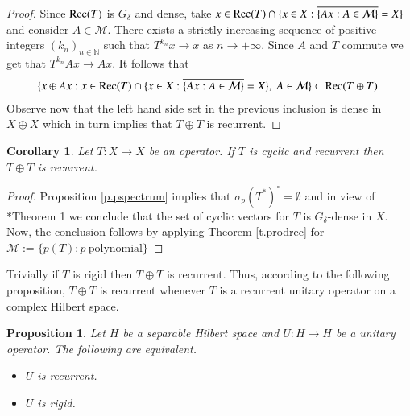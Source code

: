 \documentclass[12pt,leqno]{amsart}
\theoremstyle{plain}
\newtheorem{proposition}[equation]{Proposition}
\newtheorem{corollary}[equation]{Corollary}
\theoremstyle{definition}
\numberwithin{equation}{section}
\begin{document}
\begin{proof}
	Since ${\textnormal{Rec}}(T)$ is $G_{\delta }$ and dense, take $x\in {\textnormal{Rec}} (T)\cap \{ x\in X: \overline{ \{Ax: A\in \mathcal M \} }=X \}$ and consider $A\in \mathcal M$. There exists a strictly increasing sequence of positive integers $(k_n)_{n\in\mathbb N}$ such that $T^{k_n}x\to x$ as $n\to+\infty$. Since $A$ and $T$ commute we get that $T^{k_n}Ax\to Ax$. It follows that 
	\begin{align*}
		\{ x\oplus Ax: x\in {\textnormal{Rec}}(T)\cap \{ x\in X: \overline{ \{Ax: A\in \mathcal M \} }=X \},\ A\in \mathcal M \} \subset {\textnormal{Rec}}(T\oplus T). 
	\end{align*}
	Observe now that the left hand side set in the previous inclusion is dense in $X\oplus X$ which in turn implies that $T\oplus T$ is recurrent. 
\end{proof}

\begin{corollary}
	Let $T:X\to X$ be an operator. If $T$ is cyclic and recurrent then $T\oplus T$ is recurrent. 
\end{corollary}

\begin{proof}
	Proposition \ref{p.pspectrum} implies that $ \sigma_p(T^*) ^{\circ}=\emptyset$ and in view of \cite{H}*{Theorem 1} we conclude that the set of cyclic vectors for $T$ is $G_{\delta }$-dense in $X$. Now, the conclusion follows by applying Theorem \ref{t.prodrec} for $\mathcal M :=\{ p(T):  p \  \text{polynomial} \}$ 
\end{proof}

Trivially if $T$ is rigid then $T\oplus T$ is recurrent. Thus, according to the following proposition, $T\oplus T$ is recurrent whenever $T$ is a recurrent unitary operator on a complex Hilbert space. 

\begin{proposition}
	\label{p.urecequalsrig} Let $H$ be a separable Hilbert space and $U:H\to H$ be a unitary operator. The following are equivalent. 
	\begin{itemize}
		\item[(i)] $U$ is recurrent. 
		\item[(ii)] $U$ is rigid. 
	\end{itemize}
\end{proposition}
\end{document}
